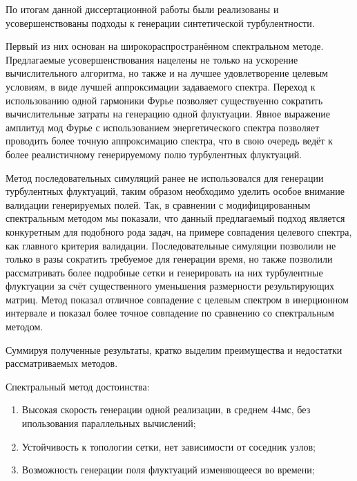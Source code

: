
По итогам данной диссертационной работы были реализованы и усовершенствованы подходы к генерации синтетической турбулентности. 

Первый из них основан на широкораспространённом спектральном методе. Предлагаемые усовершенствования нацелены не только на ускорение вычислительного алгоритма, но также и на лучшее удовлетворение целевым условиям, в виде лучшей аппроксимации задаваемого спектра. Переход к использованию одной гармоники Фурье позволяет существуенно сократить вычислительные затраты на генерацию одной флуктуации. Явное выражение амплитуд мод Фурье с использованием энергетического спектра позволяет проводить более точную аппроксимацию спектра, что в свою очередь ведёт к более реалистичному генерируемому полю турбулентных флуктуаций.

Метод последовательных симуляций ранее не использовался для генерации турбулентных флуктуаций, таким образом необходимо уделить особое внимание валидации генерируемых полей. Так, в сравнении с модифицированным спектральным методом мы показали, что данный предлагаемый подход является конкуретным для подобного рода задач, на примере совпадения целевого спектра, как главного критерия валидации. Последовательные симуляции позволили не только в разы сократить требуемое для генерации время, но также позволили рассматривать более подробные сетки и генерировать на них турбулентные флуктуации за счёт существенного уменьшения размерности результирующих матриц. Метод показал отличное совпадение с целевым спектром в инерционном интервале и показал более точное совпадение по сравнению со спектральным методом. 

Суммируя полученные результаты, кратко выделим преимущества и недостатки рассматриваемых методов.

Спектральный метод достоинства:
\begin{enumerate}
    \item Высокая скорость генерации одной реализации, в среднем $44 мс$, без ипользования параллельных вычислений;
    \item Устойчивость к топологии сетки, нет зависимости от соседник узлов;
    \item Возможность генерации поля флуктуаций изменяющееся во времени;
\end{enumerate}

